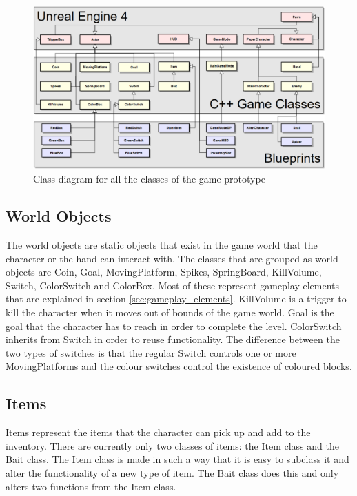 
\begin{figure}
	\includegraphics[width=\textwidth]{images/class_diagram_full}
	\caption{Class diagram for all the classes of the game prototype}
	\label{fig:class_diagram_full}
\end{figure}

\subsection{World Objects}
The world objects are static objects that exist in the game world that the character or the hand can interact with. The classes that are grouped as world objects are Coin, Goal, MovingPlatform, Spikes, SpringBoard, KillVolume, Switch, ColorSwitch and ColorBox. Most of these represent gameplay elements that are explained in section \ref{sec:gameplay_elements}. KillVolume is a trigger to kill the character when it moves out of bounds of the game world. Goal is the goal that the character has to reach in order to complete the level. ColorSwitch inherits from Switch in order to reuse functionality. The difference between the two types of switches is that the regular Switch controls one or more MovingPlatforms and the colour switches control the existence of coloured blocks.

\subsection{Items}
Items represent the items that the character can pick up and add to the inventory. There are currently only two classes of items: the Item class and the Bait class. The Item class is made in such a way that it is easy to subclass it and alter the functionality of a new type of item. The Bait class does this and only alters two functions from the Item class.

